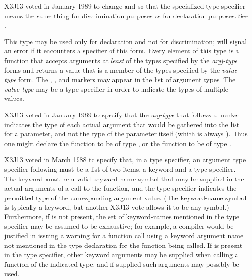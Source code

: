 \begin{flushdesc}
\begin{new}
X3J13 voted in January 1989
to change  and 
so that the specialized 
type specifier means the same thing for discrimination purposes
as for declaration purposes.
See .
\end{new}


\item[\cd{(function (\emph{arg1-type} \emph{arg2-type} ...) \emph{value-type})}]
\relax This type may be used only for declaration and not for
discrimination;  will signal an error if it encounters a specifier of
this form. Every element of this type is
a function that accepts arguments at \emph{least} of the
types specified by the \emph{argj-type} forms and returns a value that is a
member of the types specified by the \emph{value-type} form.  The
, , and  markers
may appear in the list of argument types.
The \emph{value-type} may be a  type specifier
in order to indicate the types of multiple values.

\begin{new}
X3J13 voted in January 1989
to specify that the \emph{arg-type} that
follows a  marker indicates the type of each actual argument
that would be gathered into the list for a  parameter,
and not the type of the  parameter itself (which is always
).  Thus one might declare the function  to
be of type , or
the function  to be of type
.
\end{new}

\begin{newer}
X3J13 voted in March 1988 
to specify that, in a  type specifier,
an argument type specifier following 
must be a list of two items, a keyword and a type specifier.
The keyword must be a valid keyword-name symbol that may be
supplied in the actual arguments of a call to the function,
and the type specifier indicates the permitted type of
the corresponding argument value.  (The keyword-name symbol
is typically a keyword,
but another X3J13 vote 
allows it to be any symbol.)
Furthermore, if  is not present,
the set of keyword-names mentioned in the 
type specifier may be assumed to be exhaustive;
for example, a compiler would be justified in issuing
a warning for a function call using a keyword argument name
not mentioned in the type declaration for the function being called.
If 
is present in the 
type specifier, other keyword arguments may be supplied
when calling a function of the indicated type, and if supplied such
arguments may possibly be used.
\end{newer}


\end{flushdesc}
